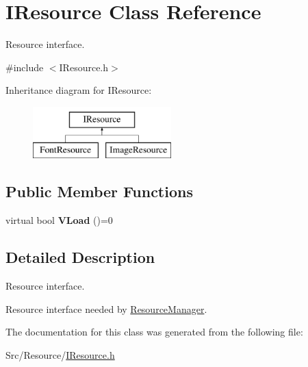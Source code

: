 \hypertarget{classIResource}{\section{I\-Resource Class Reference}
\label{classIResource}
}


Resource interface.  




{\ttfamily \#include $<$I\-Resource.\-h$>$}

Inheritance diagram for I\-Resource\-:\begin{figure}[H]
\begin{center}
\leavevmode
\includegraphics[height=2.000000cm]{classIResource}
\end{center}
\end{figure}
\subsection*{Public Member Functions}
\begin{DoxyCompactItemize}
\item 
\hypertarget{classIResource_a13701883a4d0561816630b28b92b45b5}{virtual bool {\bfseries V\-Load} ()=0}\label{classIResource_a13701883a4d0561816630b28b92b45b5}

\end{DoxyCompactItemize}


\subsection{Detailed Description}
Resource interface. 

Resource interface needed by \hyperlink{classResourceManager}{Resource\-Manager}. 

The documentation for this class was generated from the following file\-:\begin{DoxyCompactItemize}
\item 
Src/\-Resource/\hyperlink{IResource_8h}{I\-Resource.\-h}\end{DoxyCompactItemize}
